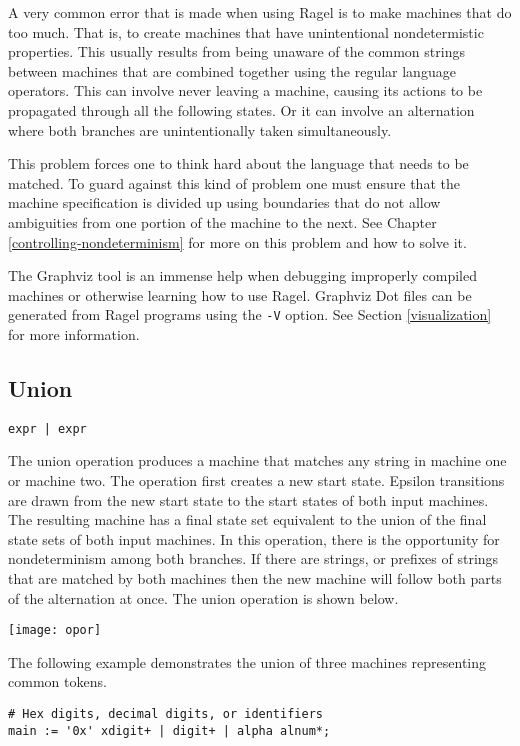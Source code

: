 \documentclass[letterpaper,11pt,oneside]{book}
\newcommand{\verbspace}{\vspace{10pt}}
\newcommand{\graphspace}{\vspace{10pt}}
\newenvironment{inline_code}{\def\baselinestretch{1}\vspace{12pt}\small}{}
\begin{document}
A very common error that is made when using Ragel is to make machines that do
too much. That is, to create machines that have unintentional
nondetermistic properties. This usually results from being unaware of the common strings
between machines that are combined together using the regular language
operators. This can involve never leaving a machine, causing its actions to be
propagated through all the following states. Or it can involve an alternation
where both branches are unintentionally taken simultaneously.

This problem forces one to think hard about the language that needs to be
matched. To guard against this kind of problem one must ensure that the machine
specification is divided up using boundaries that do not allow ambiguities from
one portion of the machine to the next. See Chapter
\ref{controlling-nondeterminism} for more on this problem and how to solve it.

The Graphviz tool is an immense help when debugging improperly compiled
machines or otherwise learning how to use Ragel. Graphviz Dot files can be
generated from Ragel programs using the \verb|-V| option. See Section
\ref{visualization} for more information.


\subsection{Union}

\verb/expr | expr/
\verbspace

The union operation produces a machine that matches any string in machine one
or machine two. The operation first creates a new start state. Epsilon
transitions are drawn from the new start state to the start states of both
input machines.  The resulting machine has a final state set equivalent to the
union of the final state sets of both input machines. In this operation, there
is the opportunity for nondeterminism among both branches. If there are
strings, or prefixes of strings that are matched by both machines then the new
machine will follow both parts of the alternation at once. The union operation is
shown below.

\graphspace
\begin{center}
\texttt{[image: opor]}
\end{center}
\graphspace

The following example demonstrates the union of three machines representing
common tokens.

\begin{inline_code}
\begin{verbatim}
# Hex digits, decimal digits, or identifiers
main := '0x' xdigit+ | digit+ | alpha alnum*;
\end{verbatim}
\end{inline_code}
\end{document}
